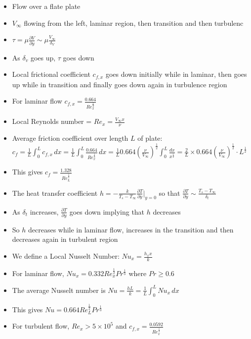 \documentclass[12pt]{article}
\begin{document}
\begin{itemize}
\begin{itemize}
        \item Flow over a flate plate
        \item $V_{\infty}$ flowing from the left, laminar region, then transition and then turbulenc
        \item $\tau = \mu \frac{\partial V}{\partial y} \sim \mu \frac{V_{\infty}}{\delta_V}$
        \item As $\delta_v$ goes up, $\tau$ goes down
        \item Local frictional coefficient $c_{f,x}$ goes down initially while in laminar, then goes up while in transition and finally goes down again in turbulence region
        \item For laminar flow $c_{f,x} = \frac{0.664}{Re_{x}^{\frac{1}{2}}}$
        \item Local Reynolds number = $Re_{x} = \frac{V_{\infty}x}{\nu}$
        \item Average friction coefficient over length $L$ of plate: $c_f = \frac{1}{L} \int_{0}^{L} c_{f,x} \, dx  = \frac{1}{L} \int_{0}^{L} \frac{0.664}{Re_x^{\frac{1}{2}}} \, dx = \frac{1}{L} 0.664 (\frac{\nu}{V_{\infty}})^{\frac{1}{2}} \int_{0}^{L} \frac{dx}{x^{\frac{1}{2}}} = \frac{2}{L} \times 0.664 (\frac{\nu}{V_{\infty}})^{\frac{1}{2}} \cdot L^{\frac{1}{2}}$
        \item This gives $c_f = \frac{1.328}{Re_L^{\frac{1}{2}}}$
        \item The heat transfer coefficient $h = - \frac{k}{T_s - T_{\infty}}  \frac{\partial T}{\partial y} |_{y = 0}$ so that $\frac{\partial T}{\partial y} \sim \frac{T_s - T_{\infty}}{\delta_t}$
        \item As $\delta_t$ increases, $\frac{\partial T}{\partial y}$ goes down implying that $h$ decreases
        \item So $h$ decreases while in laminar flow, increases in the transition and then decreases again in turbulent region
        \item We define a Local Nusselt Number: $Nu_x = \frac{h_x x}{k}$
        \item For laminar flow, $Nu_x = 0.332 Re_x ^{\frac{1}{2}} Pr ^ {\frac{1}{3}}$ where $Pr \geq 0.6$
        \item The average Nusselt number is $Nu = \frac{hL}{k} = \frac{1}{L} \int_{0}^{L} Nu_x \, dx$
        \item This gives $Nu = 0.664 Re_L^{\frac{1}{2}} Pr^{\frac{1}{3}}$
        \item For turbulent flow, $Re_x > 5 \times 10^5$ and $c_{f,x } = \frac{0.0592}{Re_x^{\frac{1}{2}}}$

\end{itemize}
\end{itemize}
\end{document}
